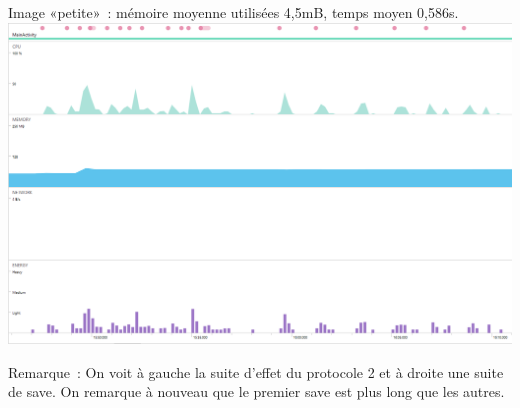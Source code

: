 \documentclass[12pt]{article}
\begin{document}
    Image «petite» : mémoire moyenne utilisées 4,5mB, temps moyen 0,586s.\\


    \includegraphics{petite-serie}

    Remarque :
    On voit à gauche la suite d’effet du protocole 2 et à droite une suite de save. On remarque à nouveau que le premier save est plus long que les autres.\\
\end{document}
